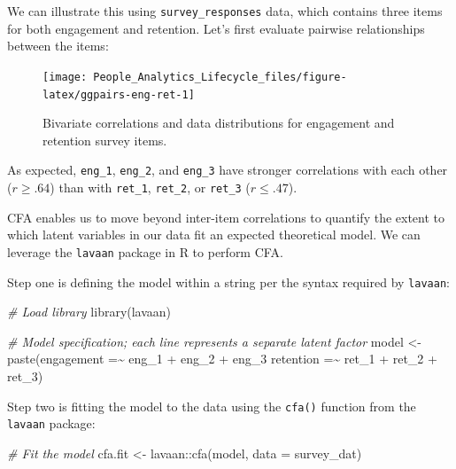 \documentclass[
]{book}
\newenvironment{Shaded}{\begin{snugshade}}{\end{snugshade}}
\newcommand{\AttributeTok}[1]{\textcolor[rgb]{0.77,0.63,0.00}{#1}}
\newcommand{\CommentTok}[1]{\textcolor[rgb]{0.56,0.35,0.01}{\textit{#1}}}
\newcommand{\FunctionTok}[1]{\textcolor[rgb]{0.00,0.00,0.00}{#1}}
\newcommand{\NormalTok}[1]{#1}
\newcommand{\OtherTok}[1]{\textcolor[rgb]{0.56,0.35,0.01}{#1}}
\newcommand{\SpecialCharTok}[1]{\textcolor[rgb]{0.00,0.00,0.00}{#1}}
\newcommand{\StringTok}[1]{\textcolor[rgb]{0.31,0.60,0.02}{#1}}
\begin{document}
We can illustrate this using \texttt{survey\_responses} data, which contains three items for both engagement and retention. Let's first evaluate pairwise relationships between the items:

\begin{figure}

{\centering \texttt{[image: People\_Analytics\_Lifecycle\_files/figure-latex/ggpairs-eng-ret-1]} 

}

\caption{Bivariate correlations and data distributions for engagement and retention survey items.}\label{fig:ggpairs-eng-ret}
\end{figure}

As expected, \texttt{eng\_1}, \texttt{eng\_2}, and \texttt{eng\_3} have stronger correlations with each other (\(r \ge .64\)) than with \texttt{ret\_1}, \texttt{ret\_2}, or \texttt{ret\_3} (\(r \le .47\)).

CFA enables us to move beyond inter-item correlations to quantify the extent to which latent variables in our data fit an expected theoretical model. We can leverage the \texttt{lavaan} package in R to perform CFA.

Step one is defining the model within a string per the syntax required by \texttt{lavaan}:

\begin{Shaded}
\begin{Highlighting}[]
\CommentTok{\# Load library}
\FunctionTok{library}\NormalTok{(lavaan)}

\CommentTok{\# Model specification; each line represents a separate latent factor}
\NormalTok{model }\OtherTok{\textless{}{-}} \FunctionTok{paste}\NormalTok{(}\StringTok{\textquotesingle{}engagement =\textasciitilde{} eng\_1 + eng\_2 + eng\_3}
\StringTok{                retention =\textasciitilde{} ret\_1 + ret\_2 + ret\_3\textquotesingle{}}\NormalTok{)}
\end{Highlighting}
\end{Shaded}

Step two is fitting the model to the data using the \texttt{cfa()} function from the \texttt{lavaan} package:

\begin{Shaded}
\begin{Highlighting}[]
\CommentTok{\# Fit the model}
\NormalTok{cfa.fit }\OtherTok{\textless{}{-}}\NormalTok{ lavaan}\SpecialCharTok{::}\FunctionTok{cfa}\NormalTok{(model, }\AttributeTok{data =}\NormalTok{ survey\_dat)}
\end{Highlighting}
\end{Shaded}
\end{document}
